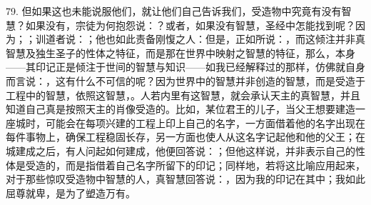 79. 但如果这也未能说服他们，就让他们自己告诉我们，受造物中究竟有没有智慧？如果没有，宗徒为何抱怨说：？或者，如果没有智慧，圣经中怎能找到呢？因为；；训道者说：；他也如此责备刚愎之人：但是，正如所说：，而这倾注并非真智慧及独生圣子的性体之特征，而是那在世界中映射之智慧的特征，那么，本身——其印记正是倾注于世间的智慧与知识——如我已经解释过的那样，仿佛就自身而言说：，这有什么不可信的呢？因为世界中的智慧并非创造的智慧，而是受造于工程中的智慧，依照这智慧，。人若内里有这智慧，就会承认天主的真智慧，并且知道自己真是按照天主的肖像受造的。比如，某位君王的儿子，当父王想要建造一座城时，可能会在每项兴建的工程上印上自己的名字，一方面借着他的名字出现在每件事物上，确保工程稳固长存，另一方面也使人从这名字记起他和他的父王；在城建成之后，有人问起如何建成，他便回答说：；但他这样说，并非表示自己的性体是受造的，而是指借着自己名字所留下的印记；同样地，若将这比喻应用起来，对于那些惊叹受造物中智慧的人，真智慧回答说：，因为我的印记在其中；我如此屈尊就卑，是为了塑造万有。\par

